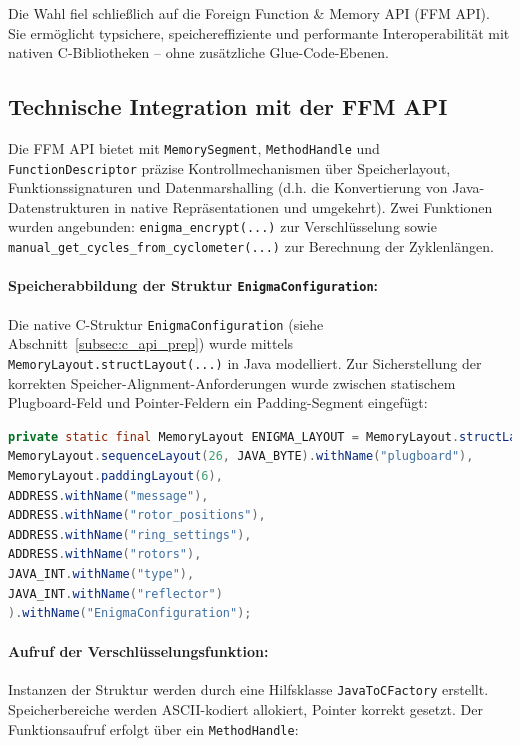 \documentclass[12pt, ngerman, a4paper, numbers=noenddot]{article}
\begin{document}
Die Wahl fiel schließlich auf die Foreign Function \& Memory API (FFM API). Sie ermöglicht typsichere, speichereffiziente und performante Interoperabilität mit nativen C-Bibliotheken – ohne zusätzliche Glue-Code-Ebenen.

\newpage
\subsection{Technische Integration mit der FFM API}
\label{subsec:ffm_integration}

Die FFM API bietet mit \lstinline|MemorySegment|, \lstinline|MethodHandle| und \lstinline|FunctionDescriptor| präzise Kontrollmechanismen über Speicherlayout, Funktionssignaturen und Datenmarshalling (d.h. die Konvertierung von Java-Datenstrukturen in native Repräsentationen und umgekehrt). Zwei Funktionen wurden angebunden: \lstinline|enigma_encrypt(...)| zur Verschlüsselung sowie \newline\lstinline|manual_get_cycles_from_cyclometer(...)| zur Berechnung der Zyklenlängen.


\paragraph{Speicherabbildung der Struktur \lstinline|EnigmaConfiguration|:}
Die native C-Struktur \lstinline|EnigmaConfiguration| (siehe Abschnitt~\ref{subsec:c_api_prep}) wurde mittels \newline\lstinline|MemoryLayout.structLayout(...)| in Java modelliert. Zur Sicherstellung der korrekten Speicher-Alignment-Anforderungen wurde zwischen statischem Plugboard-Feld und Pointer-Feldern ein Padding-Segment eingefügt:

\begin{lstlisting}[language=Java, caption={FFM-Deklaration der Struktur \lstinline|EnigmaConfiguration|}, label={lst:ffm-layout}]
private static final MemoryLayout ENIGMA_LAYOUT = MemoryLayout.structLayout(
MemoryLayout.sequenceLayout(26, JAVA_BYTE).withName("plugboard"),
MemoryLayout.paddingLayout(6),
ADDRESS.withName("message"),
ADDRESS.withName("rotor_positions"),
ADDRESS.withName("ring_settings"),
ADDRESS.withName("rotors"),
JAVA_INT.withName("type"),
JAVA_INT.withName("reflector")
).withName("EnigmaConfiguration");
\end{lstlisting}

\paragraph{Aufruf der Verschlüsselungsfunktion:}
Instanzen der Struktur werden durch eine Hilfsklasse \lstinline|JavaToCFactory| erstellt. Speicherbereiche werden ASCII-kodiert allokiert, Pointer korrekt gesetzt. \newline Der Funktionsaufruf erfolgt über ein \lstinline|MethodHandle|:
\end{document}
